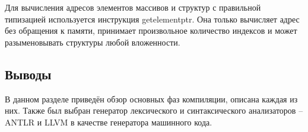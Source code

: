 Для вычисления адресов элементов массивов и структур с правильной типизацией используется инструкция getelementptr. Она только вычисляет
адрес без обращения к памяти, принимает произвольное количество индексов и может разыменовывать структуры любой вложенности. \\

\subsection*{Выводы}
В данном разделе приведён обзор основных фаз компиляции, описана каждая из них. Также был выбран генератор лексического и синтаксического анализаторов -- ANTLR и LLVM в качестве генератора машинного кода. 

\pagebreak